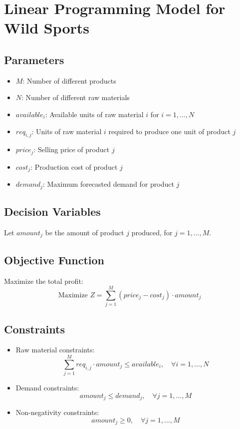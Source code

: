 \documentclass{article}
\begin{document}
\section*{Linear Programming Model for Wild Sports}

\subsection*{Parameters}
\begin{itemize}
    \item \( M \): Number of different products
    \item \( N \): Number of different raw materials
    \item \( available_i \): Available units of raw material \( i \) for \( i = 1, \ldots, N \)
    \item \( req_{i,j} \): Units of raw material \( i \) required to produce one unit of product \( j \)
    \item \( price_j \): Selling price of product \( j \)
    \item \( cost_j \): Production cost of product \( j \)
    \item \( demand_j \): Maximum forecasted demand for product \( j \)
\end{itemize}

\subsection*{Decision Variables}
Let \( amount_j \) be the amount of product \( j \) produced, for \( j = 1, \ldots, M \).

\subsection*{Objective Function}
Maximize the total profit:
\[
\text{Maximize } Z = \sum_{j=1}^{M} (price_j - cost_j) \cdot amount_j
\]

\subsection*{Constraints}
\begin{itemize}
    \item Raw material constraints:
    \[
    \sum_{j=1}^{M} req_{i,j} \cdot amount_j \leq available_i, \quad \forall i = 1, \ldots, N
    \]
    
    \item Demand constraints:
    \[
    amount_j \leq demand_j, \quad \forall j = 1, \ldots, M
    \]

    \item Non-negativity constraints:
    \[
    amount_j \geq 0, \quad \forall j = 1, \ldots, M
    \]
\end{itemize}
\end{document}
